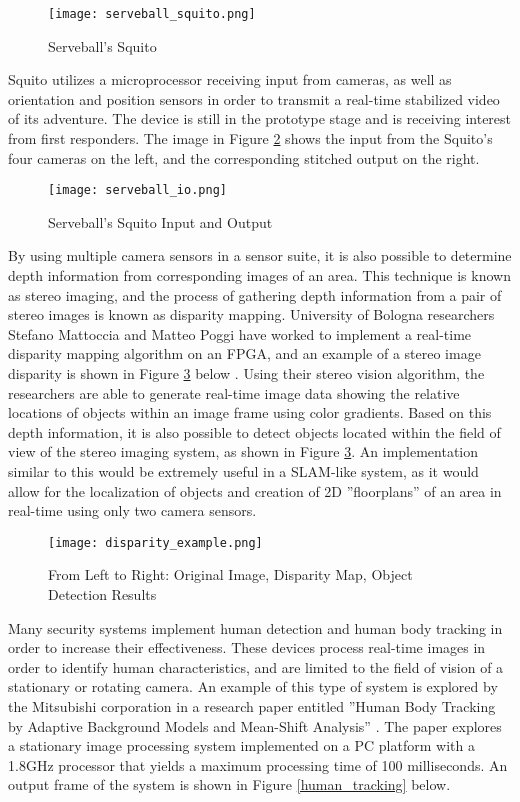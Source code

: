 \begin{figure}[H]
	\centerline{\texttt{[image: serveball\_squito.png]}}
	\caption{Serveball's Squito \cite{serveball}}
	\label{squito}
\end{figure}

Squito utilizes a microprocessor receiving input from cameras, as well as orientation and position sensors in order to transmit a real-time stabilized video of its adventure. The device is still in the prototype stage and is receiving interest from first responders. The image in Figure \ref{squito_io} shows the input from the Squito's four cameras on the left, and the corresponding stitched output on the right.

\begin{figure}[H]
	\centerline{\texttt{[image: serveball\_io.png]}}
	\caption{Serveball's Squito Input and Output \cite{serveball}}
	\label{squito_io}
\end{figure}

By using multiple camera sensors in a sensor suite, it is also possible to determine depth information from corresponding images of an area. This technique is known as stereo imaging, and the process of gathering depth information from a pair of stereo images is known as disparity mapping. University of Bologna researchers Stefano Mattoccia and Matteo Poggi have worked to implement a real-time disparity mapping algorithm on an FPGA, and an example of a stereo image disparity is shown in Figure \ref{disparity_example} below \cite{mattoccia}. Using their stereo vision algorithm, the researchers are able to generate real-time image data showing the relative locations of objects within an image frame using color gradients. Based on this depth information, it is also possible to detect objects located within the field of view of the stereo imaging system, as shown in Figure \ref{disparity_example}. An implementation similar to this would be extremely useful in a SLAM-like system, as it would allow for the localization of objects and creation of 2D ''floorplans'' of an area in real-time using only two camera sensors.

\begin{figure}[H]
	\centerline{\texttt{[image: disparity\_example.png]}}
	\caption{From Left to Right: Original Image, Disparity Map, Object Detection Results \cite{mattoccia}}
	\label{disparity_example}
\end{figure}

Many security systems implement human detection and human body tracking in order to increase their effectiveness. These devices process real-time images in order to identify human characteristics, and are limited to the field of vision of a stationary or rotating camera. An example of this type of system is explored by the Mitsubishi corporation in a research paper entitled ''Human Body Tracking by Adaptive Background Models and Mean-Shift Analysis'' \cite{porikli}. The paper explores a stationary image processing system implemented on a PC platform with a 1.8GHz processor that yields a maximum processing time of 100 milliseconds. An output frame of the system is shown in Figure \ref{human_tracking} below.

